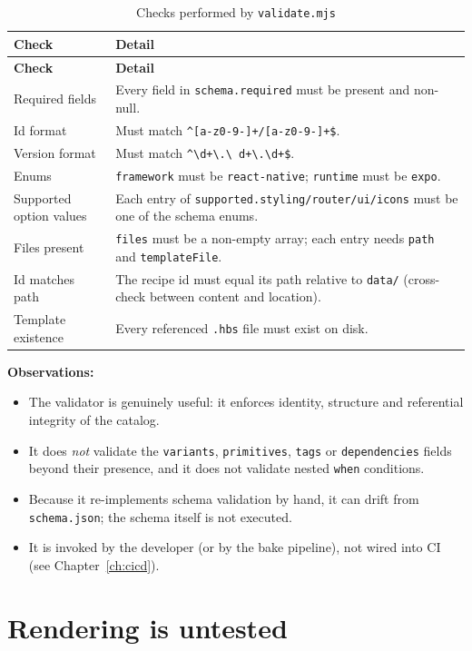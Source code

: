 \begin{longtable}{@{}L{4.6cm}L{9.6cm}@{}}
\caption{Checks performed by \texttt{validate.mjs}}\\
\toprule
\textbf{Check} & \textbf{Detail} \\
\midrule
\endfirsthead
\toprule
\textbf{Check} & \textbf{Detail} \\
\midrule
\endhead
Required fields & Every field in \texttt{schema.required} must be present and
non-null. \\
Id format & Must match \texttt{\^{}[a-z0-9-]+/[a-z0-9-]+\$}. \\
Version format & Must match \texttt{\^{}\textbackslash d+\textbackslash.\textbackslash
d+\textbackslash.\textbackslash d+\$}. \\
Enums & \texttt{framework} must be \texttt{react-native}; \texttt{runtime} must be
\texttt{expo}. \\
Supported option values & Each entry of \texttt{supported.styling/router/ui/icons}
must be one of the schema enums. \\
Files present & \texttt{files} must be a non-empty array; each entry needs
\texttt{path} and \texttt{templateFile}. \\
Id matches path & The recipe id must equal its path relative to
\texttt{data/} (cross-check between content and location). \\
Template existence & Every referenced \texttt{.hbs} file must exist on disk. \\
\bottomrule
\end{longtable}

\textbf{Observations:}
\begin{itemize}
  \item The validator is genuinely useful: it enforces identity, structure and
        referential integrity of the catalog.
  \item It does \emph{not} validate the \texttt{variants}, \texttt{primitives},
        \texttt{tags} or \texttt{dependencies} fields beyond their presence, and
        it does not validate nested \texttt{when} conditions.
  \item Because it re-implements schema validation by hand, it can drift from
        \texttt{schema.json}; the schema itself is not executed.
  \item It is invoked by the developer (or by the bake pipeline), not wired into
        CI (see Chapter~\ref{ch:cicd}).
\end{itemize}

\section{Rendering is untested}

